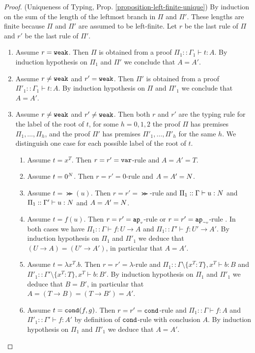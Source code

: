 \begin{proof}(Uniqueness of Typing, Prop. \ref{proposition-left-finite-unique})
By induction on the sum of the length of the leftmost branch in $\Pi$ and $\Pi'$. These lengths 
are finite because $\Pi$ and $\Pi'$ are assumed to be left-finite. Let $r$ be the last rule of $\Pi$ 
and $r'$ be the last rule of $\Pi'$.
\begin{enumerate}
\item
Assume $r = {\tt weak}$. Then $\Pi$ is obtained from a proof $\Pi_1::\Gamma_1 \vdash t:A$. 
By induction hypothesis on $\Pi_1$ and $\Pi'$ we conclude that $A = A'$.

\item
Assume $r \not = {\tt weak}$ and $r' = {\tt weak}$. 
Then $\Pi'$ is obtained from a proof $\Pi'_1::\Gamma_1 \vdash t:A$. 
By induction hypothesis on $\Pi$ and $\Pi'_1$ we conclude that $A = A'$.

\item
Assume  $r \not = {\tt weak}$ and $r' \not = {\tt weak}$. Then both $r$ and $r'$ are the typing rule for the label of the root of $t$, for some
$h=0,1,2$ the proof $\Pi$ has premises $\Pi_1, \ldots, \Pi_h$,
and the proof $\Pi'$ has premises $\Pi'_1, \ldots, \Pi'_h$ for the same $h$. 
We distinguish one case for each possible label of the root of $t$.
\begin{enumerate}
\item
Assume $t = x^T$. Then $r=r'={\tt var}$-rule and $A = A' = T$.

\item
Assume $t =0^{N}$. Then $r=r'=0$-rule and $A = A' = {N}$.

\item
Assume $t =\Succ(u)$. Then $r=r'=\Succ$-rule  and $\Pi_1::\Gamma \vdash u: {N}$
and $\Pi_1::\Gamma' \vdash u:{N}$ and $A = A' = {N}$.

\item
Assume $t = f(u)$. Then $r=r'={{\tt ap}_{\mbox{\tiny $v$}}}$-rule or $r=r'={{\tt ap}_{\mbox{\tiny $\neg v$}}}$-rule .
In both cases we have $\Pi_1::\Gamma \vdash f:U \rightarrow A$
and $\Pi_1::\Gamma' \vdash f:U' \rightarrow A'$. By induction hypothesis on 
$\Pi_1$ and $\Pi'_1$ we deduce that $(U \rightarrow A) = (U' \rightarrow A')$, 
in particular that $A = A'$.

\item
Assume $t = \lambda x^T.b$. Then $r=r'=\lambda$-rule and 
$\Pi_1::\Gamma\setminus\{x^T:T\}, x^T \vdash b:B$ and 
$\Pi'_1::\Gamma'\setminus\{x^T:T\}, x^T \vdash b:B'$. 
By induction hypothesis on $\Pi_1$ and $\Pi'_1$ we deduce that $B=B'$, in particular that $A = (T \rightarrow B) = (T \rightarrow B') = A'$.

\item
Assume $t = {\tt cond}(f,g)$. Then $r=r'={\tt cond}$-rule and $\Pi_1::\Gamma \vdash f:A$
and $\Pi'_1::\Gamma' \vdash f:A'$ by definition of ${\tt cond}$-rule with conclusion
$A$. By induction hypothesis on $\Pi_1$ and
$\Pi'_1$ we deduce that $A = A'$.
\end{enumerate}
\end{enumerate}
\end{proof}

